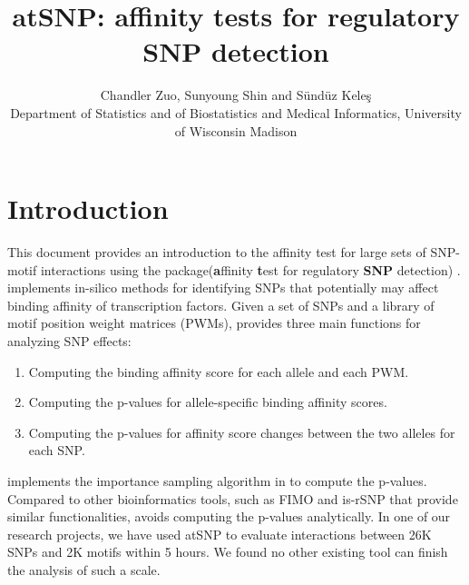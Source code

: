 \documentclass[a4paper,10pt]{article}\usepackage[]{graphicx}\usepackage[]{color}
\title{atSNP: affinity tests for regulatory SNP detection}
\author{Chandler Zuo, Sunyoung Shin and S\"und\"uz Kele\c{s}\\
Department of Statistics and of Biostatistics and Medical Informatics, University of Wisconsin Madison}
\date{}
\begin{document}
\maketitle

\tableofcontents

\section{Introduction}

This document provides an introduction to the affinity test for large sets of SNP-motif interactions using the  package(\textbf{a}ffinity \textbf{t}est for regulatory \textbf{SNP} detection) \cite{zuo15}.  implements in-silico methods for identifying SNPs that potentially may affect binding affinity of transcription factors. Given a set of SNPs and a library of motif position weight matrices (PWMs),  provides three main functions for analyzing SNP effects:


\begin{enumerate}
\item Computing the binding affinity score for each allele and each PWM.
\item Computing the p-values for allele-specific binding affinity scores.
\item Computing the p-values for affinity score changes between the two alleles for each SNP.
\end{enumerate}

 implements the importance sampling algorithm in \cite{isample} to compute the p-values. Compared to other bioinformatics tools, such as FIMO \cite{fimo} and is-rSNP \cite{is-rsnp} that provide similar functionalities,  avoids computing the p-values analytically. %
In one of our research projects, we have used atSNP to evaluate interactions between 26K SNPs and 2K motifs within 5 hours. We found no other existing tool can finish the analysis of such a scale.

\end{document}
